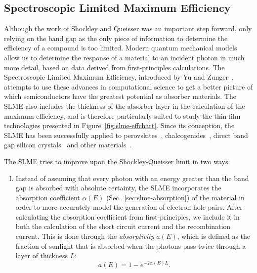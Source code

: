 \begin{refsection}


\subsection{Spectroscopic Limited Maximum Efficiency} \label{sec:slme-SLME}

Although the work of Shockley and Queisser was an important step forward, only relying on the band gap as the only piece of information to determine the efficiency of a compound is too limited. Modern quantum mechanical models allow us to determine the response of a material to an incident photon in much more detail, based on data derived from first-principles calculations. The Spectroscopic Limited Maximum Efficiency, introduced by Yu and Zunger~\cite{Yu2012}, attempts to use these advances in computational science to get a better picture of which semiconductors have the greatest potential as absorber materials. The SLME also includes the thickness of the absorber layer in the calculation of the maximum efficiency, and is therefore particularly suited to study the thin-film technologies presented in Figure~\ref{fig:slme-effchart}. Since its conception, the SLME has been successfully applied to perovskites~\cite{Yin2014, Yin2015, Yin2015b, Meng2016}, chalcogenides~\cite{Hong2016, Sarmadian2016}, direct band gap silicon crystals~\cite{Lee2014, Oh2015} and other materials~\cite{Yu2012b, Yokoyama2013, Heo2014, Huang2015}. 

The SLME tries to improve upon the Shockley-Queisser limit in two ways: 
\vspace{0.1in}
\begin{enumerate}[I.]

\item Instead of assuming that every photon with an energy greater than the band gap is absorbed with absolute certainty, the SLME incorporates the absorption coefficient $\alpha(E)$ (Sec.~\ref{sec:slme-absorption}) of the material in order to more accurately model the generation of electron-hole pairs. After calculating the absorption coefficient from first-principles, we include it in both the calculation of the short circuit current and the recombination current. This is done through the \textit{absorptivity} $a(E)$, which is defined as the fraction of sunlight that is absorbed when the photons pass twice through a layer of thickness $L$:
\begin{equation} \label{eq:slme-absorptivity}
a(E) = 1 - e^{-2 \alpha(E) L}.
\end{equation}


\end{enumerate}
\end{refsection}
